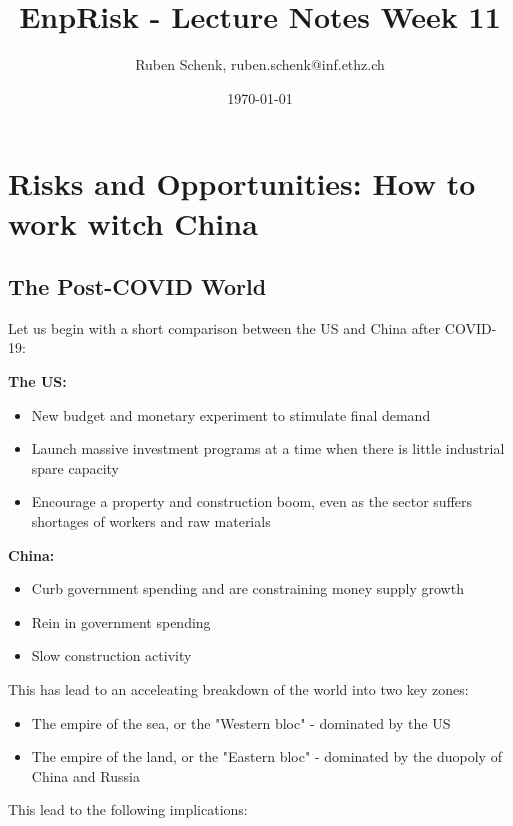 \documentclass[a4paper]{extarticle}
\title{EnpRisk - Lecture Notes Week 11}
\author{Ruben Schenk, ruben.schenk@inf.ethz.ch}
\date{\today}
\begin{document}
\maketitle

\section{Risks and Opportunities: How to work witch China}

\subsection{The Post-COVID World}

Let us begin with a short comparison between the US and China after COVID-19:

\textbf{The US:}

\begin{itemize}
    \item New budget and monetary experiment to stimulate final demand
    \item Launch massive investment programs at a time when there is little industrial spare capacity
    \item Encourage a property and construction boom, even as the sector suffers shortages of workers and raw materials
\end{itemize}

\textbf{China:}

\begin{itemize}
    \item Curb government spending and are constraining money supply growth
    \item Rein in government spending
    \item Slow construction activity
\end{itemize}

This has lead to an acceleating breakdown of the world into two key zones:

\begin{itemize}
    \item The empire of the sea, or the "Western bloc" - dominated by the US
    \item The empire of the land, or the "Eastern bloc" - dominated by the duopoly of China and Russia
\end{itemize}

This lead to the following implications:
\end{document}
